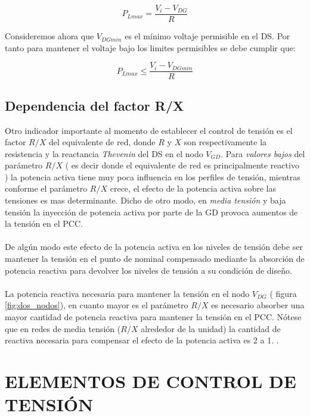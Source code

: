 \documentclass[12pt, letterpaper]{report}
\begin{document}
\[P_{Lmax} = \dfrac{V_{i} - V_{DG }}{R}\]

Consideremos ahora que $V_{DGmin}$ es el mínimo voltaje permisible en el \ac{DS}. Por tanto para mantener el voltaje bajo los limites permisibles  se debe cumplir que:

\[P_{Lmax} \leq \dfrac{V_{i} - V_{DGmin}}{R}\]

\subsection{Dependencia del factor R/X}
Otro indicador importante al momento de establecer el control de tensión es el factor $ R/X$ del equivalente de red, donde $R$  y $X$ son respectivamente la resistencia y la reactancia  \textit{Thevenin} del \ac{DS} en el nodo $V_{GD}$.    Para \textit{valores bajos} del parámetro $R/X$ ( es decir donde el equivalente de red es principalmente reactivo ) la potencia activa tiene muy poca  influencia en los perfiles de tensión, mientras conforme el parámetro $R/X$ crece, el efecto de la potencia activa sobre las tensiones es mas determinante. Dicho de otro modo, en \textit{media tensión } y baja tensión la inyección de potencia activa por parte de la GD provoca aumentos de la tensión en el PCC.\\\\
De algún modo este efecto de la potencia activa en los niveles de tensión debe ser mantener la tensión en el punto de nominal compensado mediante la absorción de potencia reactiva para devolver los niveles de tensión a su condición de diseño.\\\\
La potencia reactiva necesaria para mantener la tensión en el nodo $ V_{DG}$ ( figura \ref{fig:dos_nodos}), en cuanto mayor es el parámetro $R/X$ es necesario absorber una mayor cantidad de potencia reactiva  para mantener la tensión en el PCC. Nótese que en redes de media tensión ($R/X$ alrededor de la unidad) la cantidad de  reactiva necesaria para compensar el efecto de la potencia activa es 2 a 1. \cite{trebolle2012control}.

\section{ELEMENTOS DE CONTROL DE TENSIÓN}
\end{document}
